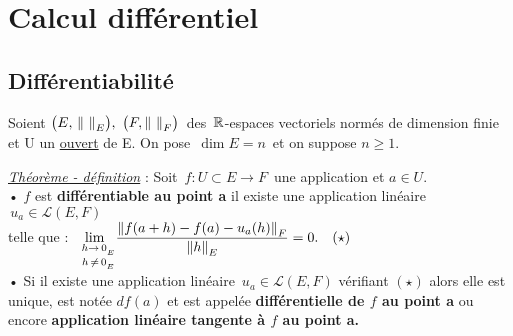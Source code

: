 
\section{Calcul différentiel}

\vspace{0.7cm}

\subsection{Différentiabilité}

\vspace{0.7cm}

\begin{center}
    Soient \(\bigl(E,\,\norm{\ }_E\bigr),\ \bigl(F,\norm{\ }_F\bigr)\,\) des \(\,\mathbb{R}\)-espaces vectoriels normés de dimension finie\vspace{0.1cm}\\
    et U un \underline{ouvert} de E. On pose \(\,\dim E=n\,\) et on suppose $n\geq 1$.
\end{center}

\vspace{1cm}

\underline{\emph{Théorème - définition}} : Soit \(\, f:U\subset E\to F\,\) une application et \(a\in U.\)\vspace*{0.4cm}\\
• $f$ est \textbf{différentiable au point a} \ssi il existe une application linéaire \(\,u_a\in\mathscr{L}(E,F)\)\vspace{0.15cm}\\
telle que : \(\displaystyle \lim_{\ \; \substack{\vspace{0.05cm}h\to\, 0_{_E} \\ h\,\neq\, 0_{_E}}}\!\frac{\norm{f(a+h)-f(a)-u_a(h)}_F}{\norm{h}_E}=0.\quad (\star)\)\vspace{0.5cm}\\
• Si il existe une application linéaire \(\,u_a\!\in\!\mathscr{L}(E,F)\) vérifiant $(\star)$ alors elle est unique, est notée \(df(a)\) et est appelée \textbf{différentielle de $f$ au point a} ou encore \textbf{application linéaire tangente à $f$ au point a.}

\vspace{1cm}

